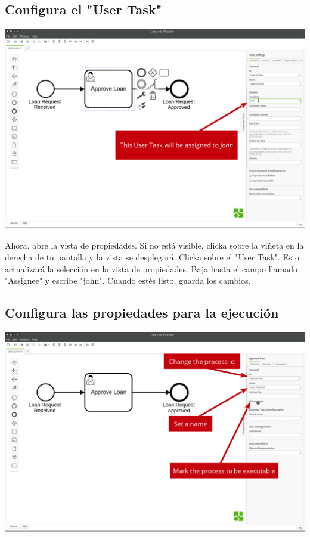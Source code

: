 \documentclass{article}
\begin{document}
\subsection{Configura el "User Task"}

\begin{center}
\includegraphics[width=\textwidth]{modeler-step4.png}
\end{center}

Ahora, abre la vista de propiedades. Si no está visible, clicka sobre la viñeta en la derecha de tu pantalla y la vista se desplegará.
Clicka sobre el "User Task". Esto actualizará la selección en la vista de propiedades. Baja hasta el campo llamado "Assignee" y escribe "john".
Cuando estés listo, guarda los cambios.

\subsection{Configura las propiedades para la ejecución}

\begin{center}
\includegraphics[width=\textwidth]{modeler-step5.png}
\end{center}
\end{document}
